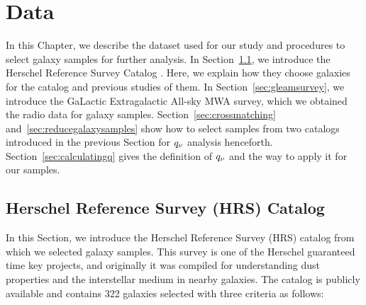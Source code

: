 \chapter{Data}\label{chap:data}
\begin{chapabstract}

In this Chapter, we describe the dataset used for our study and procedures to select galaxy samples for further analysis.
In Section~\ref{sec:HerschelReferenceSurvey}, we introduce the Herschel Reference Survey Catalog \citep{Boselli2010}.
Here, we explain how they choose galaxies for the catalog and previous studies of them.
In Section~\ref{sec:gleamsurvey}, we introduce the GaLactic Extragalactic All-sky MWA survey, which we obtained the radio data for galaxy samples.
Section~\ref{sec:crossmatching} and~\ref{sec:reducegalaxysamples} show how to select samples from two catalogs introduced in the previous Section for $q_{\nu}$ analysis henceforth.
Section~\ref{sec:calculatingq} gives the definition of $q_{\nu}$ and the way to apply it for our samples.

\end{chapabstract}

\section{Herschel Reference Survey (HRS) Catalog}\label{sec:HerschelReferenceSurvey}
In this Section, we introduce the Herschel Reference Survey (HRS) catalog \citep{Boselli2010} from which we selected galaxy samples.
This survey is one of the Herschel guaranteed time key projects, and originally it was compiled for understanding dust properties and the interstellar medium in nearby galaxies.
The catalog is publicly available and contains 322 galaxies selected with three criteria as follows:

